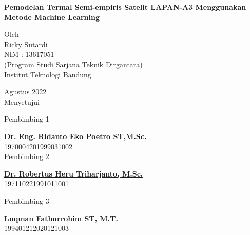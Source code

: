 \begin{center}
       \Large
        \vspace{1.5cm}
        \large
        \textbf{Pemodelan Termal Semi-empiris Satelit LAPAN-A3 Menggunakan Metode Machine Learning}\\
        
        \vfill
        
        Oleh\\
        Ricky Sutardi\\
        NIM : 13617051\\
        (Program Studi Sarjana Teknik Dirgantara)\\
        Institut Teknologi Bandung
       
       \vfill
       
       Agustus 2022\\
        \vspace{1.0cm}
       Menyetujui\\
       \begin{multicols}{2}
       
       \footnotesize Pembimbing 1 \\
       \vspace{3.5cm}
       
        \footnotesize \textbf{\underline{Dr. Eng. Ridanto Eko Poetro ST,M.Sc.}}\\
				\footnotesize 1970004201999031002 \\
        
        \footnotesize Pembimbing 2 \\
       \vspace{3.5cm}
       
       \footnotesize  \textbf{\underline{Dr. Robertus Heru Triharjanto, M.Sc.}}\\
        \footnotesize 197110221991011001 \\
        \end{multicols}

       \footnotesize Pembimbing 3 \\
       \vspace{3.5cm}
       
       \footnotesize \textbf{\underline{Luqman Fathurrohim ST, M.T.}}\\
        \footnotesize 199401212020121003 \\
       
\end{center}
